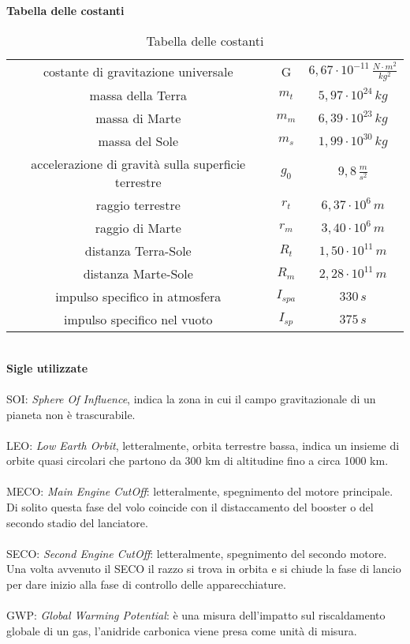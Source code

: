 \textbf{\huge Tabella delle costanti}\\
\begin{table}[h!]
    \centering
    \begin{tabular}{c|c|c}
        \hline
        costante di gravitazione universale & G & $6,67 \cdot 10^{-11}\,\frac{N \cdot m^2}{kg^2}$\\
        massa della Terra & $m_t$ & $5,97 \cdot 10^{24}\,kg$\\
        massa di Marte & $m_m$ & $6,39 \cdot 10^{23}\,kg$ \\
        massa del Sole & $m_s$ & $ 1,99 \cdot 10^{30}\, kg$ \\
        accelerazione di gravità sulla superficie terrestre & $g_0$ & $9,8\,\frac{m}{s^2}$ \\
        raggio terrestre & $r_t$ & $6,37 \cdot 10^6 \, m$ \\
        raggio di Marte & $r_m$ & $3,40 \cdot 10^{6} \, m$ \\
        distanza Terra-Sole & $R_t$ & $1,50 \cdot 10^{11}\, m$ \\
        distanza Marte-Sole & $R_m$ & $2,28 \cdot 10^{11}\, m$ \\
        impulso specifico in atmosfera & $I_{spa}$ & $330\,s$ \\
        impulso specifico nel vuoto & $I_{sp}$ & $375\,s$ \\
        \hline
    \end{tabular}
    \caption{Tabella delle costanti}
    \label{tabella costanti}
\end{table}
\\
\textbf{\huge Sigle utilizzate}\\
\\
SOI: \textit{Sphere Of Influence}, indica la zona in cui il campo gravitazionale di un pianeta non è trascurabile.\\
\\
LEO: \textit{Low Earth Orbit}, letteralmente, orbita terrestre bassa, indica un insieme di orbite quasi circolari che partono da 300 km di altitudine fino a circa 1000 km.\\
\\
MECO: \textit{Main Engine CutOff}: letteralmente, spegnimento del motore principale. Di solito questa fase del volo coincide con il distaccamento del booster o del secondo stadio del lanciatore.\\
\\
SECO: \textit{Second Engine CutOff}: letteralmente, spegnimento del secondo motore. Una volta avvenuto il SECO il razzo si trova in orbita e si chiude la fase di lancio per dare inizio alla fase di controllo delle apparecchiature.\\
\\
GWP: \textit{Global Warming Potential}:
è una misura dell'impatto sul riscaldamento globale di un gas, l'anidride carbonica viene presa come unità di misura.\\
